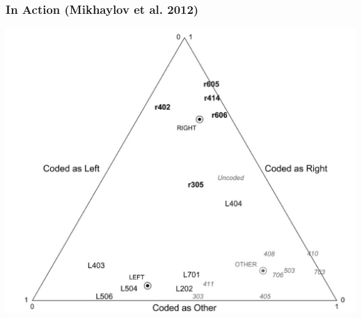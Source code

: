 \documentclass[11pt,compress,professionalfonts]{beamer}
\begin{document}
\begin{frame}[t]\frametitle{In Action (Mikhaylov et al. 2012)}

\centerline{\includegraphics[scale=.7]{pictures/slava-rile2}}

\end{frame}
\end{document}

